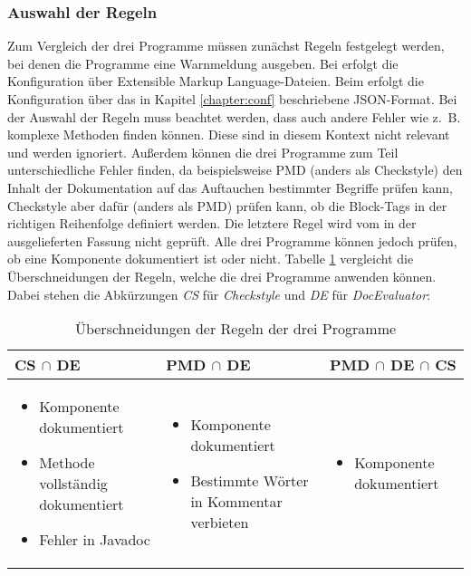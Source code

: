 \subsubsection{Auswahl der Regeln}
Zum Vergleich der drei Programme müssen zunächst Regeln festgelegt werden, bei denen die Programme eine Warnmeldung ausgeben. Bei \checkpmd{} erfolgt die Konfiguration über  Extensible Markup Language-Dateien. Beim \doceval erfolgt die Konfiguration über das in Kapitel \ref{chapter:conf} beschriebene \ac{JSON}-Format. Bei der Auswahl der Regeln muss beachtet werden, dass \checkpmd auch andere Fehler wie z.~B. komplexe Methoden finden können. Diese sind in diesem Kontext nicht relevant und werden ignoriert. Außerdem können die drei Programme zum Teil unterschiedliche Fehler finden, da beispielsweise PMD (anders als Checkstyle) den Inhalt der Dokumentation auf das Auftauchen bestimmter Begriffe prüfen kann, Checkstyle aber dafür (anders als PMD) prüfen kann, ob die Block-Tags in der richtigen Reihenfolge definiert werden. Die letztere Regel wird vom \doceval in der ausgelieferten Fassung nicht geprüft. Alle drei Programme können jedoch prüfen, ob eine Komponente dokumentiert ist oder nicht. Tabelle \ref{tab:inters_rules} vergleicht die Überschneidungen der Regeln, welche die drei Programme anwenden können. Dabei stehen die Abkürzungen \textit{CS} für \textit{Checkstyle} und \textit{DE} für \textit{DocEvaluator}:

\begin{table}[]
    \centering
    \begin{tabular}{m{4.5cm}|m{4.5cm}|m{4.5cm}}
     \textbf{CS} $\cap$ \textbf{DE}  & \textbf{PMD} $\cap$ \textbf{DE} & \textbf{PMD} $\cap$ \textbf{DE} $\cap$  \textbf{CS}  \\\hline
     \begin{itemize}
        \item Komponente dokumentiert
        \item Methode vollständig dokumentiert
         \item Fehler in Javadoc
     \end{itemize}
      & 
      \begin{itemize}
          \item Komponente dokumentiert
          \item Bestimmte Wörter in Kommentar verbieten
      \end{itemize}
      & 
       \begin{itemize}
          \item Komponente dokumentiert
         
      \end{itemize}
      \\\hline
    \end{tabular}
    \caption{Überschneidungen der Regeln der drei Programme}
    \label{tab:inters_rules}
\end{table}


